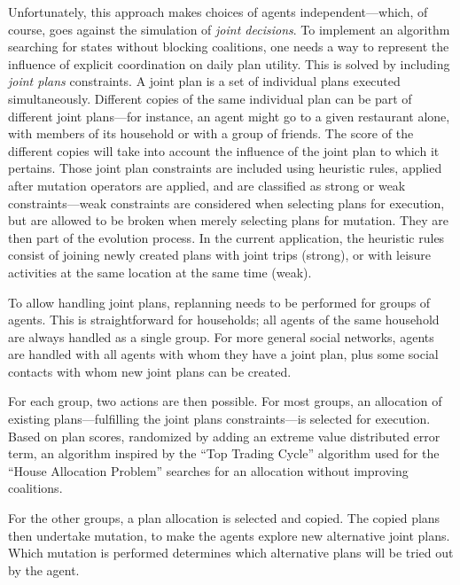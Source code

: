 {Unfortunately, this approach makes choices of agents independent---which, of course, goes against the simulation of \emph{joint decisions}. To implement an algorithm searching for states without
blocking coalitions, one needs a way to represent the influence of explicit coordination on daily plan utility. This is solved by including \emph{joint plans} constraints. A joint plan is a set of
individual plans executed simultaneously. Different copies of the same individual plan can be part of different joint plans---for instance, an agent might go to a given restaurant alone, with members of its
household or with a group of friends. The score of the different copies will take into account the influence of the joint plan to which it pertains. Those joint plan constraints are included using heuristic
rules, applied after mutation operators are applied, and are classified as strong or weak constraints---weak constraints are considered when selecting plans for execution, but are allowed to be broken when merely selecting plans for mutation. They are then part of the evolution process. In the current application, the heuristic rules consist of joining newly created plans with joint trips (strong), or with leisure activities at the same location at the same time (weak).

To allow handling joint plans, replanning needs to be performed for groups of agents. This is straightforward for households; all agents of the same household are always handled as a single group. For more general social networks, agents are handled with all agents with whom they have a joint plan, plus some social contacts with whom new joint plans can be created.

For each group, two actions are then possible. For most groups, an allocation of existing plans---fulfilling the joint plans constraints---is selected for execution. Based on plan scores, randomized by adding an extreme value distributed error term, an algorithm inspired by the ``Top Trading Cycle'' algorithm used for the ``House Allocation Problem'' \citep{SchummerVohra_NisanEtAl_2007} searches for an allocation without improving coalitions.

For the other groups, a plan allocation is selected and copied. The copied plans then undertake mutation, to make the agents explore new alternative joint plans. Which mutation is performed  determines which alternative plans will be tried out by the agent.

}
